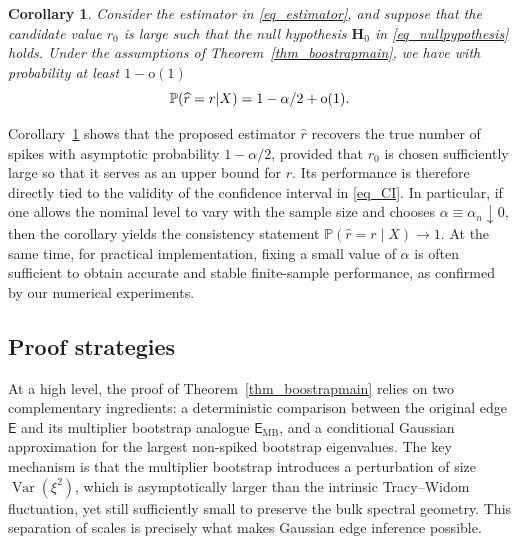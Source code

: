 \documentclass[12pt]{article}
\theoremstyle{plain}
\newtheorem{corollary}{Corollary}[section]
\numberwithin{equation}{section}
\begin{document}
\begin{corollary}\label{cor_spikeestimation}
	Consider the estimator in \eqref{eq_estimator}, and suppose that the candidate value $r_0$ is large such that the null hypothesis $\mathbf H_0$ in \eqref{eq_nullpypothesis} holds. Under the assumptions of Theorem~\ref{thm_boostrapmain}, we have with probability at least $1-\mathrm{o}(1)$ \vspace*{-10pt}
	\begin{equation*}
		\vspace*{-10pt}
		\mathbb{P}(\widehat{r}=r | X)=1-\alpha/2+\mathrm{o}(1).
	\end{equation*}
\end{corollary}

Corollary~\ref{cor_spikeestimation} shows that the proposed estimator $\widehat r$ recovers the true number of spikes with asymptotic probability $1-\alpha/2$, provided that $r_0$ is chosen sufficiently large so that it serves as an upper bound for $r$. Its performance is therefore directly tied to the validity of the confidence interval in \eqref{eq_CI}. In particular, if one allows the nominal level to vary with the sample size and chooses $\alpha \equiv \alpha_n\downarrow 0$, then the corollary yields the consistency statement $\mathbb{P}(\widehat r=r\mid X)\to 1$. At the same time, for practical implementation, fixing a small value of $\alpha$ is often sufficient to obtain accurate and stable finite-sample performance, as confirmed by our numerical experiments.

\subsection{Proof strategies}\label{sec_strate}
At a high level, the proof of Theorem~\ref{thm_boostrapmain} relies on two complementary ingredients: a deterministic comparison between the original edge $\mathsf E$ and its multiplier bootstrap analogue $\mathsf E_{\mathrm{MB}}$, and a conditional Gaussian approximation for the largest non-spiked bootstrap eigenvalues. The key mechanism is that the multiplier bootstrap introduces a perturbation of size $\operatorname{Var}(\xi^2)$, which is asymptotically larger than the intrinsic Tracy--Widom fluctuation, yet still sufficiently small to preserve the bulk spectral geometry. This separation of scales is precisely what makes Gaussian edge inference possible.
\end{document}
